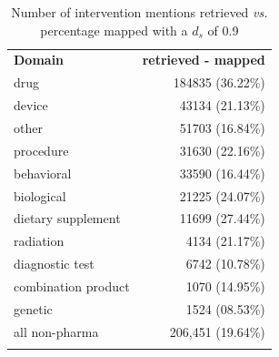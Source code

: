 \documentclass[11pt]{article}
\begin{document}
%
\begin{table}[!htbp]
\centering
\begin{tabular}{lr}
\Xhline{1pt} \textbf{Domain} & \textbf{ retrieved - mapped } \\ \Xhline{1pt}
drug & 184835 (36.22\%) \\
device & 43134 (21.13\%) \\
other & 51703 (16.84\%) \\
procedure & 31630 (22.16\%) \\
behavioral & 33590 (16.44\%) \\
biological & 21225 (24.07\%) \\
dietary supplement & 11699 (27.44\%) \\
radiation & 4134 (21.17\%) \\
diagnostic test & 6742 (10.78\%) \\
combination product & 1070 (14.95\%) \\
genetic & 1524 (08.53\%) \\
all non-pharma & 206,451 (19.64\%)\\
\Xhline{1pt}
\end{tabular}
\caption{Number of intervention mentions retrieved \textit{vs.} percentage mapped with a $d_s$ of 0.9}
\label{table:int_type09} 
\end{table}
%
%
%
\end{document}
